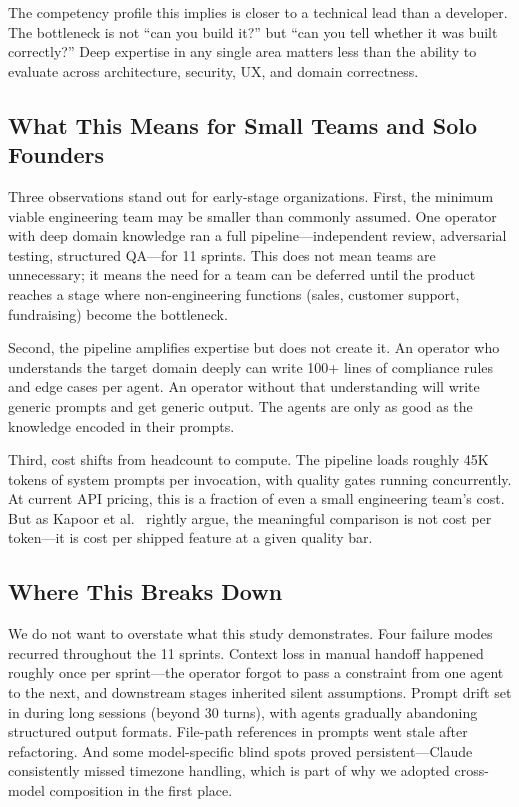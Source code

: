 \documentclass[11pt,a4paper]{article}
\begin{document}
The competency profile this implies is closer to a technical lead than a developer. The bottleneck is not ``can you build it?'' but ``can you tell whether it was built correctly?'' Deep expertise in any single area matters less than the ability to evaluate across architecture, security, UX, and domain correctness.

\subsection{What This Means for Small Teams and Solo Founders}

Three observations stand out for early-stage organizations. First, the minimum viable engineering team may be smaller than commonly assumed. One operator with deep domain knowledge ran a full pipeline---independent review, adversarial testing, structured QA---for 11 sprints. This does not mean teams are unnecessary; it means the need for a team can be deferred until the product reaches a stage where non-engineering functions (sales, customer support, fundraising) become the bottleneck.

Second, the pipeline amplifies expertise but does not create it. An operator who understands the target domain deeply can write 100+ lines of compliance rules and edge cases per agent. An operator without that understanding will write generic prompts and get generic output. The agents are only as good as the knowledge encoded in their prompts.

Third, cost shifts from headcount to compute. The pipeline loads roughly 45K tokens of system prompts per invocation, with quality gates running concurrently. At current API pricing, this is a fraction of even a small engineering team's cost. But as Kapoor et al.~\cite{kapoor2024} rightly argue, the meaningful comparison is not cost per token---it is cost per shipped feature at a given quality bar.

\subsection{Where This Breaks Down}

We do not want to overstate what this study demonstrates. Four failure modes recurred throughout the 11 sprints. Context loss in manual handoff happened roughly once per sprint---the operator forgot to pass a constraint from one agent to the next, and downstream stages inherited silent assumptions. Prompt drift set in during long sessions (beyond 30 turns), with agents gradually abandoning structured output formats. File-path references in prompts went stale after refactoring. And some model-specific blind spots proved persistent---Claude consistently missed timezone handling, which is part of why we adopted cross-model composition in the first place.
\end{document}
